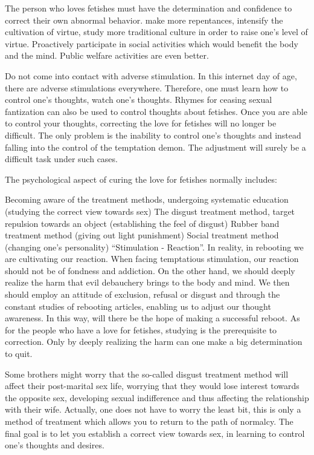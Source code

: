 \documentclass[
]{book}
\begin{document}
The person who loves fetishes must have the determination and confidence to correct their own abnormal behavior. make more repentances, intensify the cultivation of virtue, study more traditional culture in order to raise one's level of virtue. Proactively participate in social activities which would benefit the body and the mind. Public welfare activities are even better.

Do not come into contact with adverse stimulation. In this internet day of age, there are adverse stimulations everywhere. Therefore, one must learn how to control one's thoughts, watch one's thoughts. Rhymes for ceasing sexual fantization can also be used to control thoughts about fetishes. Once you are able to control your thoughts, correcting the love for fetishes will no longer be difficult. The only problem is the inability to control one's thoughts and instead falling into the control of the temptation demon. The adjustment will surely be a difficult task under such cases.

The psychological aspect of curing the love for fetishes normally includes:

Becoming aware of the treatment methods, undergoing systematic education (studying the correct view towards sex)
The disgust treatment method, target repulsion towards an object (establishing the feel of disgust)
Rubber band treatment method (giving out light punishment)
Social treatment method (changing one's personality)
``Stimulation - Reaction''. In reality, in rebooting we are cultivating our reaction. When facing temptatious stimulation, our reaction should not be of fondness and addiction. On the other hand, we should deeply realize the harm that evil debauchery brings to the body and mind. We then should employ an attitude of exclusion, refusal or disgust and through the constant studies of rebooting articles, enabling us to adjust our thought awareness. In this way, will there be the hope of making a successful reboot. As for the people who have a love for fetishes, studying is the prerequisite to correction. Only by deeply realizing the harm can one make a big determination to quit.

Some brothers might worry that the so-called disgust treatment method will affect their post-marital sex life, worrying that they would lose interest towards the opposite sex, developing sexual indifference and thus affecting the relationship with their wife. Actually, one does not have to worry the least bit, this is only a method of treatment which allows you to return to the path of normalcy. The final goal is to let you establish a correct view towards sex, in learning to control one's thoughts and desires.
\end{document}
